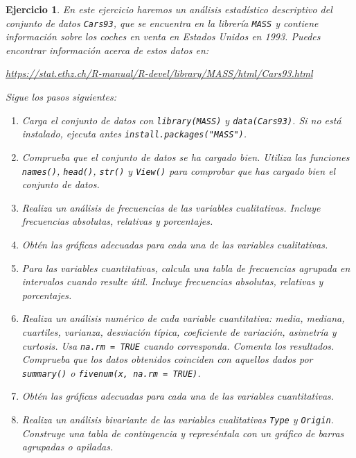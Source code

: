 \documentclass[11pt,a4paper]{article}
\theoremstyle{exercise}
\newtheorem{exercise}{Ejercicio}
\begin{document}
\begin{exercise} En este ejercicio haremos un análisis estadístico descriptivo del conjunto de datos \texttt{Cars93}, que se encuentra en la librería \texttt{MASS} y contiene información sobre los coches en venta en Estados Unidos en 1993. Puedes encontrar información acerca de estos datos en:

\begin{center}
	\url{https://stat.ethz.ch/R-manual/R-devel/library/MASS/html/Cars93.html}
\end{center}	

Sigue los pasos siguientes:

\begin{enumerate}
	\item Carga el conjunto de datos con \texttt{library(MASS)} y \texttt{data(Cars93)}. Si no está instalado, ejecuta antes \texttt{install.packages("MASS")}.

	\item Comprueba que el conjunto de datos se ha cargado bien. Utiliza las funciones \texttt{names()}, \texttt{head()}, \texttt{str()} y \texttt{View()} para comprobar que has cargado bien el conjunto de datos.

	\item Realiza un análisis de frecuencias de las variables cualitativas. Incluye frecuencias absolutas, relativas y porcentajes.

	\item Obtén las gráficas adecuadas para cada una de las variables cualitativas. 

	\item Para las variables cuantitativas, calcula una tabla de frecuencias agrupada en intervalos cuando resulte útil. Incluye frecuencias absolutas, relativas y porcentajes.

	\item Realiza un análisis numérico de cada variable cuantitativa: media, mediana, cuartiles, varianza, desviación típica, coeficiente de variación, asimetría y curtosis. Usa \texttt{na.rm = TRUE} cuando corresponda. Comenta los resultados. Comprueba que los datos obtenidos coinciden con aquellos dados por \texttt{summary()} o \texttt{fivenum(x, na.rm = TRUE)}.

	\item Obtén las gráficas adecuadas para cada una de las variables cuantitativas.

	\item Realiza un análisis bivariante de las variables cualitativas \texttt{Type} y \texttt{Origin}. Construye una tabla de contingencia y represéntala con un gráfico de barras agrupadas o apiladas.


\end{enumerate}
\end{exercise}
\end{document}
